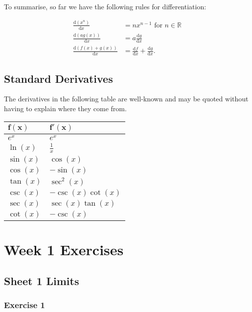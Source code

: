 \documentclass[
  11pt,
  oneside]{book}
\newcommand{\slide}{}
\theoremstyle{definition}
\theoremstyle{definition}
\theoremstyle{definition}
\theoremstyle{definition}
\theoremstyle{remark}
\begin{document}
\slide

To summarise, so far we have the following rules for differentiation:

\begin{align*}
\frac{\mathrm{d}(x^n)}{\mathrm{d} x} &= nx^{n-1}\text{ for }n\in{\mathbb R}\\
\frac{\mathrm{d}(ag(x))}{\mathrm{d} x} &= a\frac{\mathrm{d} g}{\mathrm{d} x}\\
\frac{\mathrm{d}(f(x)+g(x))}{\mathrm{d} x} &= \frac{\mathrm{d} f}{\mathrm{d} x}+\frac{\mathrm{d} g}{\mathrm{d} x}.
\end{align*}
\slide

\section{Standard Derivatives}\label{standard-derivatives}

The derivatives in the following table are well-known and may be quoted without having to explain where they come from.

\begin{longtable}[]{@{}ll@{}}
\toprule\noalign{}
\(\mathbf{f(x)}\) & \(\mathbf{f'(x)}\) \\
\midrule\noalign{}
\endhead
\bottomrule\noalign{}
\endlastfoot
\(e^x\) & \(e^x\) \\
\(\ln(x)\) & \(\frac{1}{x}\) \\
\(\sin(x)\) & \(\cos(x)\) \\
\(\cos(x)\) & \(-\sin(x)\) \\
\(\tan(x)\) & \(\sec^2(x)\) \\
\(\csc(x)\) & \(-\csc(x)\cot(x)\) \\
\(\sec(x)\) & \(\sec(x)\tan(x)\) \\
\(\cot(x)\) & \(-\csc(x)\) \\
\end{longtable}

\chapter*{Week 1 Exercises}\label{week-1-exercises}

\section{Sheet 1 Limits}\label{sheet-1-limits}

\subsection*{Exercise 1}\label{exercise-1}
\end{document}
